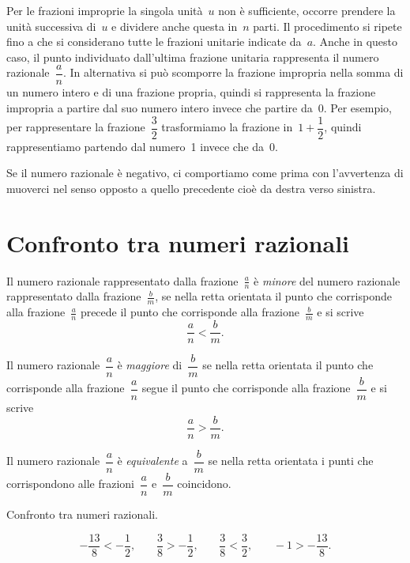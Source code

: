 Per le frazioni improprie la singola unità~$u$ non è sufficiente, occorre prendere la unità successiva di~$u$ e
dividere anche questa in~$n$ parti. Il procedimento si ripete fino a che si considerano tutte
le frazioni unitarie indicate da~$a$. Anche in questo caso, il punto individuato dall'ultima frazione unitaria
rappresenta il numero razionale~$\dfrac{a}{n}$. In alternativa si può scomporre la frazione impropria
nella somma di un numero intero e di una frazione propria, quindi si rappresenta la frazione impropria
a partire dal suo numero intero invece che partire da~0. Per esempio, per rappresentare la frazione~$\dfrac{3}{2}$
trasformiamo la frazione in~$1+\dfrac{1}{2}$, quindi rappresentiamo partendo dal numero~1 invece che da~0.

Se il numero razionale è negativo, ci comportiamo come prima con l'avvertenza di muoverci nel senso opposto a quello precedente cioè da destra verso sinistra.

\begin{center}

\end{center}

\ovalbox{\risolvii \ref{ese:3.33}, \ref{ese:3.34}, \ref{ese:3.35}, \ref{ese:3.36}}

\section{Confronto tra numeri razionali}

Il numero razionale rappresentato dalla frazione~$\frac{a}{n}$ è \emph{minore} del numero razionale
rappresentato dalla frazione~$\frac{b}{m}$, se nella retta orientata il punto che corrisponde alla
frazione~$\frac{a}{n}$ precede il punto che corrisponde alla frazione~$\frac{b}{m}$ e si scrive
\[\frac{a}{n}<\frac{b}{m}.\]

Il numero razionale~$\dfrac{a}{n}$ è \emph{maggiore} di~$\dfrac{b}{m}$
se nella retta orientata il punto che corrisponde alla frazione~$\dfrac{a}{n}$ segue il punto che corrisponde
alla frazione~$\dfrac{b}{m}$ e si scrive
\[\frac{a}{n}>\frac{b}{m}.\]

Il numero razionale~$\dfrac{a}{n}$ è \emph{equivalente} a~$\dfrac{b}{m}$ se nella retta orientata i punti che corrispondono
alle frazioni~$\dfrac{a}{n}$ e~$\dfrac{b}{m}$ coincidono.

\begin{exrig}
\begin{esempio}
Confronto tra numeri razionali.
\begin{center}

\end{center}
\[-\frac{13}{8}<-\frac{1}{2}\text{,}\qquad\frac{3}{8}>-\frac{1}{2}\text{,}\qquad\frac{3}{8}<\frac{3}{2}\text{,}\qquad-1>-\frac{13}{8}.\]
\end{esempio}
\end{exrig}


